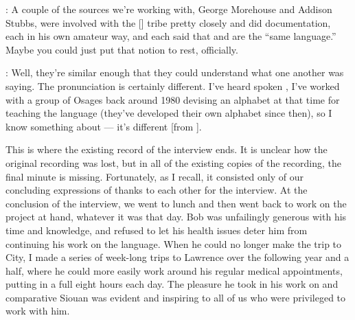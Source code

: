 \documentclass[output=paper]{LSP/langsci}
\begin{document}
: A couple of the sources we're working with, George Morehouse and Addison Stubbs, were involved with the [] tribe pretty closely and did documentation, each in his own amateur way, and each said that  and  are the ``same language.'' Maybe you could just put that notion to rest, officially.

: Well, they're similar enough that they could understand what one another was saying. The pronunciation is certainly different. I've heard spoken , I've worked with a group of Osages back around 1980 devising an alphabet at that time for teaching the language (they've developed their own alphabet since then), so I know something about  --- it's different [from ].

\noindent This is where the existing record of the interview ends. It is unclear how the original recording was lost, but in all of the existing copies of the recording, the final minute is missing. Fortunately, as I recall, it consisted only of our concluding expressions of thanks to each other for the interview. At the conclusion of the interview, we went to lunch and then went back to work on the project at hand, whatever it was that day. Bob was unfailingly generous with his time and knowledge, and refused to let his health issues deter him from continuing his work on the language. When he could no longer make the trip to  City, I made a series of week-long trips to Lawrence over the following year and a half, where he could more easily work around his regular medical appointments, putting in a full eight hours each day. The pleasure he took in his work on  and comparative Siouan was evident and inspiring to all of us who were privileged to work with him. 

\printbibliography[heading=subbibliography,notkeyword=this] 
\end{document}
